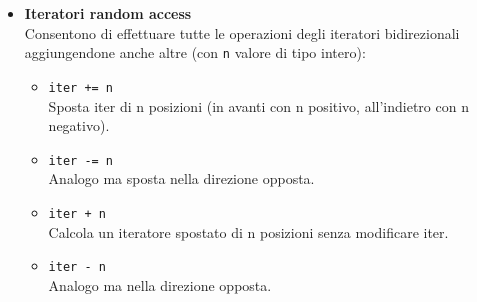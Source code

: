 \documentclass{article}
\newcommand\tab[1][1cm]{\hspace*{#1}}
\begin{document}
\begin{itemize}
\texttt{\#include <list>\\ \#include <iostream> \\ \\ int main() \{ \\ \\ \tab std::list<int> lista = \{ 1, 2, 3, 4, 5 \}; \\ \\ \tab \textcolor{grigio}{ // Modifica degli elementi della lista.} \\ \tab for(auto i = lista.begin(); i != lista.end(); ++i) \\ \tab \tab *i += 10; \\ \\ \tab \textcolor{grigio}{ // Stampa dei valori all'indietro. }\\ \tab for(auto i = lista.cbegin(); i != lista.cend(); ) \{ \\ \tab \tab --i; \textcolor{grigio}{// \'E necessario decrementare prima di \\ \tab \tab // effettuare l'operazione. \\} \tab \tab std::cout << *i << std::endl; \\ \tab \} \\ \tab \textcolor{grigio}{ // auto = const\_iterator. }\\ \} }\\
\item \textbf{\textcolor{blu}{Iteratori random access}} \\ Consentono di effettuare tutte le operazioni degli iteratori bidirezionali aggiungendone anche altre (con \texttt{n} valore di tipo intero):\\
\begin{itemize}
\item \texttt{iter += n}\\Sposta iter di n posizioni (in avanti con n positivo, all'indietro con n negativo).\\
\item \texttt{iter -= n}\\Analogo ma sposta nella direzione opposta.\\
\item \texttt{iter + n}\\Calcola un iteratore spostato di n posizioni senza modificare iter.\\
\item \texttt{iter - n}\\Analogo ma nella direzione opposta.\\

\end{itemize}
\end{itemize}
\end{document}
